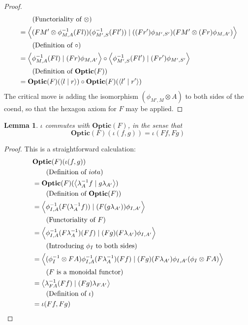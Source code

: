 \documentclass[11pt,letterpaper]{article}
\theoremstyle{plain}
\newtheorem{lemma}[theorem]{Lemma}
\theoremstyle{definition}
\newcommand{\Optic}{\mathbf{Optic}}
\newcommand{\rep}[2]{{\ensuremath \left\langle #1 \mid #2 \right\rangle}}
\begin{document}
\begin{proof}
\begin{align*}
&\qquad \text{(Functoriality of $\otimes$)} \\
&= \rep{(FM' \otimes \phi^{-1}_{M,A} (Fl))(\phi^{-1}_{M',S} (Fl'))}{((Fr') \phi_{M',S'})(FM' \otimes (Fr) \phi_{M,A'})} \\
&\qquad \text{(Definition of $\circ$)} \\
&= \rep{\phi^{-1}_{M,A} (Fl)}{(Fr) \phi_{M,A'}} \circ \rep{\phi^{-1}_{M',S} (Fl')}{(Fr') \phi_{M',S'}} \\
&\qquad \text{(Definition of $\Optic(F)$)} \\
&= \Optic(F)(\rep{l}{r}) \circ \Optic(F)(\rep{l'}{r'})
\end{align*}
\endgroup
The critical move is adding the isomorphism $(\phi_{M', M} \otimes A)$ to both sides of the coend, so that the hexagon axiom for $F$ may be applied.
\end{proof}

\begin{lemma}\label{lem:iota-commute-with-opticf}
$\iota$ commutes with $\Optic(F)$, in the sense that
\[ \Optic(F)(\iota(f, g)) = \iota(Ff, Fg) \]
\end{lemma}
\begin{proof}
This is a straightforward calculation:
  \begin{align*}
    & \Optic(F)(\iota(f, g)) \\
    &\qquad \text{(Definition of $iota$)} \\    
    &= \Optic(F)(\rep{\lambda_A^{-1} f}{g \lambda_{A'}}) \\
    &\qquad \text{(Definition of $\Optic(F)$)} \\    
    &= \rep{\phi^{-1}_{I,A} (F(\lambda_A^{-1} f))}{(F(g \lambda_{A'})) \phi_{I,A'}} \\
    &\qquad \text{(Functoriality of $F$)} \\    
    &= \rep{\phi^{-1}_{I,A} (F\lambda_A^{-1}) (Ff)}{(Fg)(F \lambda_{A'}) \phi_{I,A'}} \\
    &\qquad \text{(Introducing $\phi_I$ to both sides)} \\    
    &= \rep{(\phi^{-1}_I \otimes FA) \phi^{-1}_{I,A} (F\lambda_A^{-1}) (Ff)}{(Fg)(F \lambda_{A'}) \phi_{I,A'} (\phi_I \otimes FA)} \\
    &\qquad \text{($F$ is a monoidal functor)} \\    
    &= \rep{\lambda_{FA}^{-1} (Ff)}{(Fg)\lambda_{FA'}} \\
    &\qquad \text{(Definition of $\iota$)} \\    
    &= \iota(Ff, Fg)
  \end{align*}
\end{proof}
\end{document}
